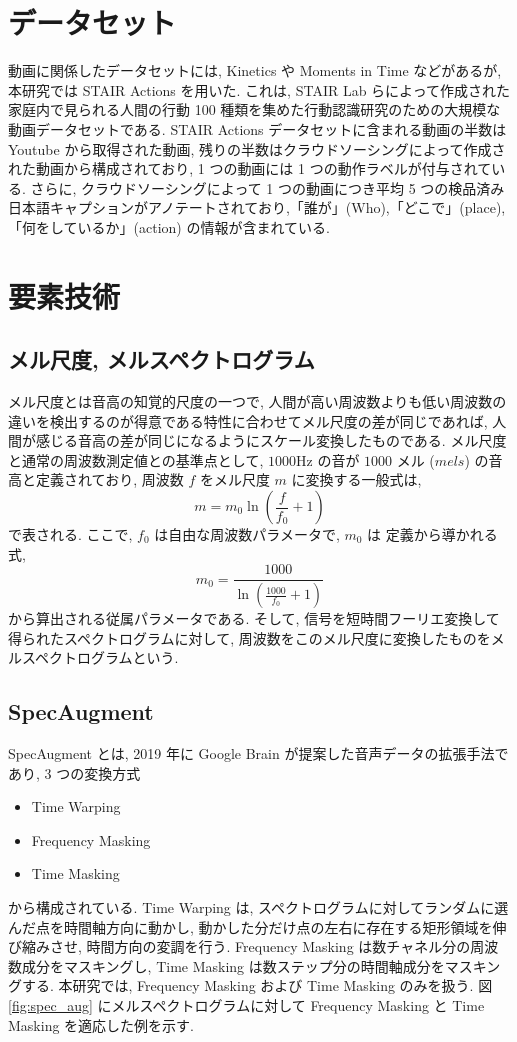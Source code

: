 \documentclass[twocolumn]{jarticle}     %
\begin{document}
\section{データセット}
動画に関係したデータセットには, Kinetics や Moments in Time などがあるが, 本研究では STAIR Actions \cite{yoshikawa2018stair} を用いた. これは, STAIR Lab らによって作成された家庭内で見られる人間の行動 100 種類を集めた行動認識研究のための大規模な動画データセットである. STAIR Actions データセットに含まれる動画の半数は Youtube から取得された動画, 残りの半数はクラウドソーシングによって作成された動画から構成されており, 1 つの動画には 1 つの動作ラベルが付与されている. さらに, クラウドソーシングによって 1 つの動画につき平均 5 つの検品済み日本語キャプションがアノテートされており,「誰が」(Who),「どこで」(place),「何をしているか」(action) の情報が含まれている.


\section{要素技術}
\subsection{メル尺度, メルスペクトログラム}
メル尺度とは音高の知覚的尺度の一つで, 人間が高い周波数よりも低い周波数の違いを検出するのが得意である特性に合わせてメル尺度の差が同じであれば, 人間が感じる音高の差が同じになるようにスケール変換したものである. メル尺度と通常の周波数測定値との基準点として, $1000 \si{\hertz}$ の音が $1000$ メル ($mels$) の音高と定義されており, 周波数 $f$ をメル尺度 $m$ に変換する一般式は,
\begin{equation}
  m = m_{0}\ln(\frac{f}{f_{0}}+1)
\end{equation}
で表される. ここで, $f_{0}$ は自由な周波数パラメータで, $m_{0}$ は 定義から導かれる式,
\begin{equation}
  m_{0} = \frac{1000}{\ln(\frac{1000}{f_{0}} + 1)}
\end{equation}
から算出される従属パラメータである. そして, 信号を短時間フーリエ変換して得られたスペクトログラムに対して, 周波数をこのメル尺度に変換したものをメルスペクトログラムという.

\newpage
\subsection{SpecAugment}
SpecAugment \cite{Park_2019} とは, 2019 年に Google Brain が提案した音声データの拡張手法であり, 3 つの変換方式
\begin{itemize}
  \item Time Warping
  \item Frequency Masking
  \item Time Masking
\end{itemize}
から構成されている. Time Warping は, スペクトログラムに対してランダムに選んだ点を時間軸方向に動かし, 動かした分だけ点の左右に存在する矩形領域を伸び縮みさせ, 時間方向の変調を行う. Frequency Masking は数チャネル分の周波数成分をマスキングし, Time Masking は数ステップ分の時間軸成分をマスキングする.
本研究では, Frequency Masking および Time Masking のみを扱う. 図 \ref{fig:spec_aug} にメルスペクトログラムに対して Frequency Masking と Time Masking を適応した例を示す.
\end{document}
